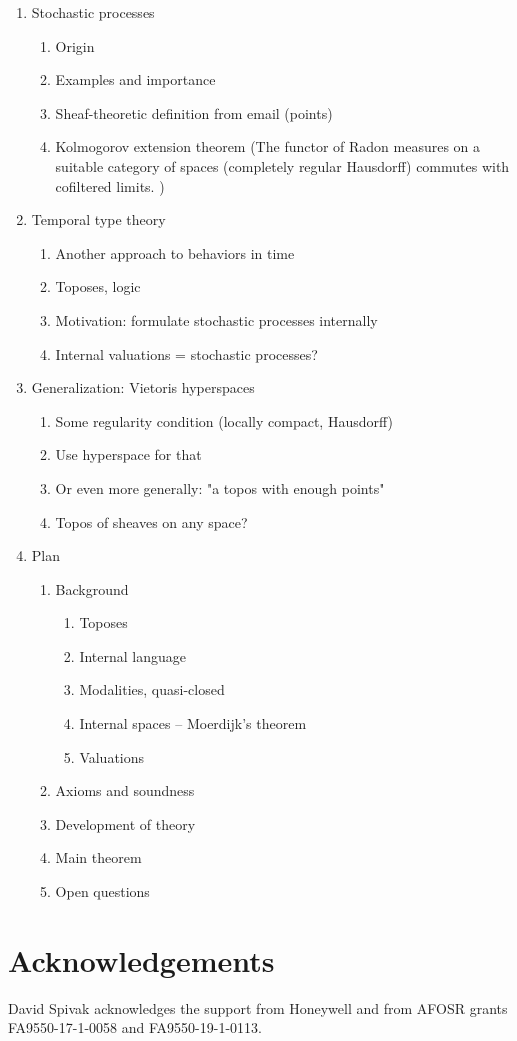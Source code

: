 \documentclass[11pt, oneside, article]{memoir}
\theoremstyle{plain}
\theoremstyle{definition}
\theoremstyle{remark}
\begin{document}
\begin{enumerate}
	\item Stochastic processes
  \begin{enumerate}
  	\item Origin
		\item Examples and importance
		\item Sheaf-theoretic definition from email (points)
		\item Kolmogorov extension theorem (The functor of Radon measures on a suitable category of spaces (completely regular Hausdorff) commutes with cofiltered limits.
		)
	\end{enumerate}	
	\item Temporal type theory
  \begin{enumerate}
  	\item Another approach to behaviors in time
		\item Toposes, logic
		\item Motivation: formulate stochastic processes internally
		\item Internal valuations = stochastic processes?
	\end{enumerate}	
	\item Generalization: Vietoris hyperspaces
  \begin{enumerate}
  	\item Some regularity condition (locally compact, Hausdorff)
		\item Use hyperspace for that
		\item Or even more generally: "a topos with enough points"
		\item Topos of sheaves on any space?
	\end{enumerate}	
		
	\item Plan
  \begin{enumerate}
  	\item Background
	  \begin{enumerate}
	  	\item Toposes
			\item Internal language
			\item Modalities, quasi-closed
			\item Internal spaces -- Moerdijk's theorem
			\item Valuations
		\end{enumerate}
		\item Axioms and soundness
		\item Development of theory
		\item Main theorem
		\item Open questions
	\end{enumerate}	
\end{enumerate}

\section*{Acknowledgements}
David Spivak acknowledges the support from Honeywell and from AFOSR grants FA9550-17-1-0058 and FA9550-19-1-0113.

\printbibliography
\end{document}
